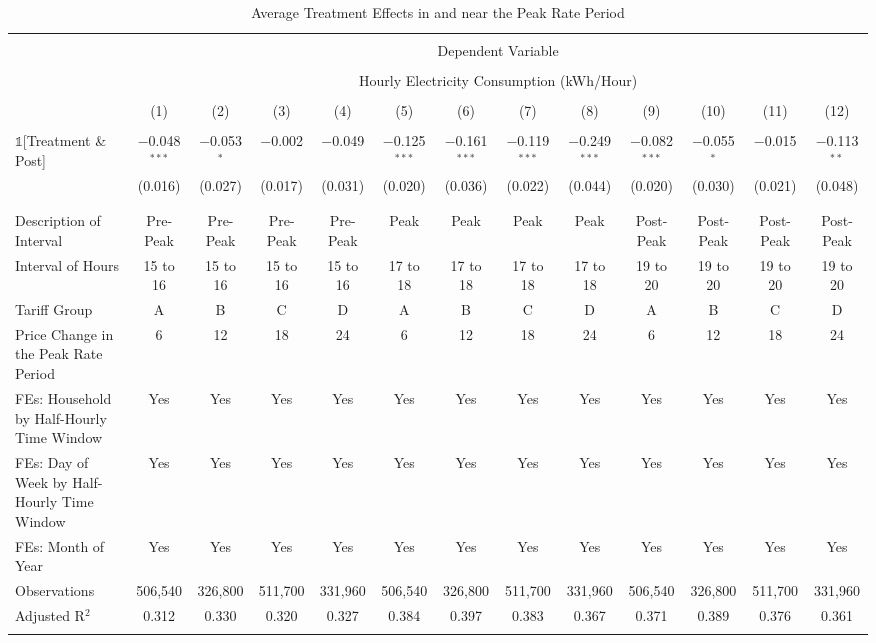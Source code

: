 
\begin{table}[!htbp] \centering 
  \caption{Average Treatment Effects in and near the Peak Rate Period} 
  \label{Table:Average-Treatment-Effects-in-and-near-the-Peak-Rate-Period} 
\small 
\begin{tabular}{@{\extracolsep{1pt}}lcccccccccccc} 
\\[-1.8ex]\hline 
\hline \\[-1.8ex] 
 & \multicolumn{12}{c}{Dependent Variable} \\ 
\cline{2-13} 
\\[-1.8ex] & \multicolumn{12}{c}{Hourly Electricity Consumption  (kWh/Hour)} \\ 
\\[-1.8ex] & (1) & (2) & (3) & (4) & (5) & (6) & (7) & (8) & (9) & (10) & (11) & (12)\\ 
\hline \\[-1.8ex] 
 $\mathbb{1}$[Treatment \& Post] & $-$0.048$^{***}$ & $-$0.053$^{*}$ & $-$0.002 & $-$0.049 & $-$0.125$^{***}$ & $-$0.161$^{***}$ & $-$0.119$^{***}$ & $-$0.249$^{***}$ & $-$0.082$^{***}$ & $-$0.055$^{*}$ & $-$0.015 & $-$0.113$^{**}$ \\ 
  & (0.016) & (0.027) & (0.017) & (0.031) & (0.020) & (0.036) & (0.022) & (0.044) & (0.020) & (0.030) & (0.021) & (0.048) \\ 
  & & & & & & & & & & & & \\ 
\hline \\[-1.8ex] 
Description of Interval & Pre-Peak & Pre-Peak & Pre-Peak & Pre-Peak & Peak & Peak & Peak & Peak & Post-Peak & Post-Peak & Post-Peak & Post-Peak \\ 
Interval of Hours & 15 to 16 & 15 to 16 & 15 to 16 & 15 to 16 & 17 to 18 & 17 to 18 & 17 to 18 & 17 to 18 & 19 to 20 & 19 to 20 & 19 to 20 & 19 to 20 \\ 
Tariff Group & A & B & C & D & A & B & C & D & A & B & C & D \\ 
Price Change in the Peak Rate Period & 6 & 12 & 18 & 24 & 6 & 12 & 18 & 24 & 6 & 12 & 18 & 24 \\ 
FEs: Household by Half-Hourly Time Window & Yes & Yes & Yes & Yes & Yes & Yes & Yes & Yes & Yes & Yes & Yes & Yes \\ 
FEs: Day of Week by Half-Hourly Time Window & Yes & Yes & Yes & Yes & Yes & Yes & Yes & Yes & Yes & Yes & Yes & Yes \\ 
FEs: Month of Year & Yes & Yes & Yes & Yes & Yes & Yes & Yes & Yes & Yes & Yes & Yes & Yes \\ 
Observations & 506,540 & 326,800 & 511,700 & 331,960 & 506,540 & 326,800 & 511,700 & 331,960 & 506,540 & 326,800 & 511,700 & 331,960 \\ 
Adjusted R$^{2}$ & 0.312 & 0.330 & 0.320 & 0.327 & 0.384 & 0.397 & 0.383 & 0.367 & 0.371 & 0.389 & 0.376 & 0.361 \\ 
\hline 
\hline \\[-1.8ex] 
\end{tabular} 
\end{table} 
